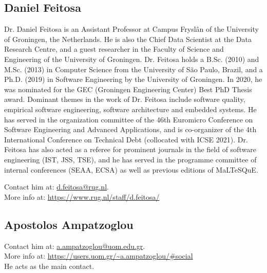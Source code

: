 \subsection{Daniel Feitosa}
Dr. Daniel Feitosa is an Assistant Professor at Campus Fryslân of the University of Groningen, the Netherlands. He is also the Chief Data Scientist at the Data Research Centre, and a guest researcher in the Faculty of Science and Engineering of the University of Groningen. 
Dr. Feitosa holds a B.Sc. (2010) and M.Sc. (2013) in Computer Science from the University of São Paulo, Brazil, and a Ph.D. (2019) in Software Engineering by the University of Groningen. In 2020, he was nominated for the GEC (Groningen Engineering Center) Best PhD Thesis award. Dominant themes in the work of Dr. Feitosa include software quality, empirical software engineering, software architecture and embedded systems.
He has served in the organization committee of the 46th Euromicro Conference on Software Engineering and Advanced Applications, and is co-organizer of the 4th International Conference on Technical Debt (collocated with ICSE 2021). Dr. Feitosa has also acted as a referee for prominent journals in the field of software engineering (IST, JSS, TSE), and he has served in the programme committee of internal conferences (SEAA, ECSA) as well as previous editions of MaLTeSQuE.

\medskip
\noindent Contact him at: \href{mailto:d.feitosa@rug.nl}{d.feitosa@rug.nl}.\\
More info at: \url{https://www.rug.nl/staff/d.feitosa/}\\


\subsection{Apostolos Ampatzoglou}



\medskip
\noindent Contact him at: \href{mailto:a.ampatzoglou@uom.edu.gr}{a.ampatzoglou@uom.edu.gr}.\\
More info at: \url{https://users.uom.gr/~a.ampatzoglou/#social}\\
He acts as the main contact.